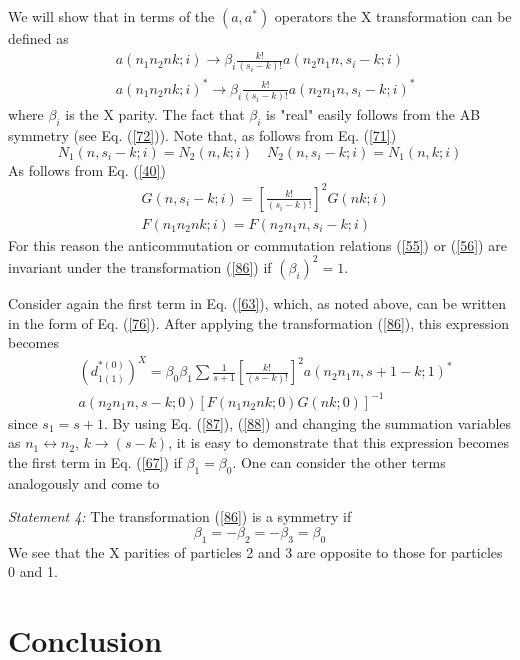 \documentclass[a4paper,12pt]{article}%
\begin{document}
We will show that in terms of the $(a,a^*)$ operators
the X transformation can be defined as
\begin{eqnarray}
&a(n_1n_2nk;i)\rightarrow \beta_i \frac{k!}{(s_i-k)!}
a(n_2n_1n,s_i-k;i)\nonumber\\
&a(n_1n_2nk;i)^*\rightarrow \beta_i \frac{k!}{(s_i-k)!}
a(n_2n_1n,s_i-k;i)^*
\label{86}
\end{eqnarray} 
where $\beta_i$ is the X parity. The fact that $\beta_i$
is "real" easily follows from the AB symmetry (see Eq.
(\ref{72})). Note that, as follows from Eq. (\ref{71})
\begin{equation}
N_1(n,s_i-k;i)=N_2(n,k;i)\quad N_2(n,s_i-k;i)=N_1(n,k;i)
\label{87}
\end{equation} 
As follows from Eq. (\ref{40})
\begin{eqnarray}
&G(n,s_i-k;i)=[\frac{k!}{(s_i-k)!}]^2G(nk;i)\nonumber\\
&F(n_1n_2nk;i)=F(n_2n_1n,s_i-k;i) 
\label{88}
\end{eqnarray}
For this reason the anticommutation or commutation
relations (\ref{55}) or (\ref{56}) are invariant under
the transformation (\ref{86}) if $(\beta_i)^2=1$.

Consider again the first term in Eq. (\ref{63}), which,
as noted above, can be written in the form of Eq. 
(\ref{76}). After applying the transformation (\ref{86}),
this expression becomes
\begin{eqnarray}
&(d_{1(1)}^{*(0)})^X=\beta_0\beta_1
\sum \frac{1}{s+1}[\frac{k!}{(s-k)!}]^2
a(n_2n_1n,s+1-k;1)^*\nonumber\\
&a(n_2n_1n,s-k;0)[F(n_1n_2nk;0)G(nk;0)]^{-1}
\label{89}
\end{eqnarray}
since $s_1=s+1$. By using Eq. (\ref{87}), (\ref{88})
and changing the summation variables as 
$n_1\leftrightarrow n_2$, $k\rightarrow (s-k)$, it is
easy to demonstrate that this expression becomes the
first term in Eq. (\ref{67}) if $\beta_1=\beta_0$.
One can consider the other terms analogously and come to

{\it Statement 4:} The transformation (\ref{86}) is
a symmetry if
\begin{equation}
\beta_1=-\beta_2=-\beta_3=\beta_0
\label{90}
\end{equation}
We see that the X parities of particles 2 and 3 are
opposite to those for particles 0 and 1.

\section{Conclusion}
\label{S10}
\end{document}
